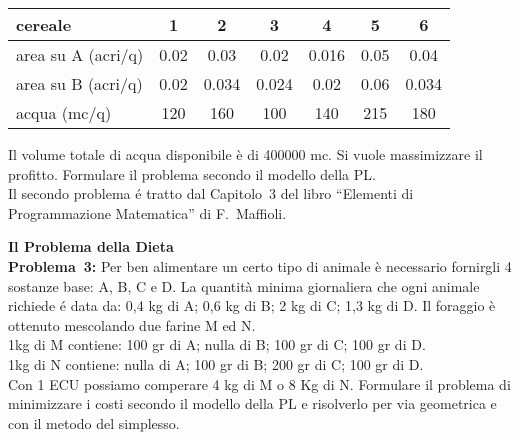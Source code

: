 \documentclass[11pt]{article}
\begin{document}
\begin{table}[!htb]
\begin{tabular}{|l|cccccc|} \hline
   cereale            &    1 &     2 &     3 &     4 &    5 &     6 \\
 \hline
   area su A (acri/q) & 0.02 &  0.03 &  0.02 & 0.016 & 0.05 &  0.04 \\ 
   area su B (acri/q) & 0.02 & 0.034 & 0.024 &  0.02 & 0.06 & 0.034 \\ 
   acqua       (mc/q) &  120 &   160 &   100 &   140 &  215 &   180 \\ 
\hline

\end{tabular}
\end{table}


Il volume totale di acqua disponibile
\`e di 400000 mc.
Si vuole massimizzare il profitto.
Formulare il problema secondo il modello della PL.\\

Il secondo problema \'e tratto dal Capitolo~3
del libro ``Elementi di Programmazione Matematica'' 
di F.~Maffioli.\\

\bigskip


{\large \bf Il Problema della Dieta}\\

{\sc \bf Problema~3\/:}
Per ben alimentare un certo tipo di animale
\`e necessario fornirgli 4 sostanze base:
A, B, C e D.
La quantit\`a minima giornaliera che ogni animale richiede
\'e data da: 0,4 kg di A; 0,6 kg di B; 2 kg di C;
1,3 kg di D.
Il foraggio \`e ottenuto mescolando due farine M ed N.\\

1kg di M contiene: 100 gr di A; nulla di B; 100 gr di C; 100 gr di D.\\
\indent
1kg di N contiene: nulla di A; 100 gr di B; 200 gr di C; 100 gr di D.\\

Con 1 ECU possiamo comperare 4 kg di M o 8 Kg di N.
Formulare il problema di minimizzare i costi
secondo il modello della PL
e risolverlo per via geometrica e con il metodo del simplesso.\\
\end{document}
